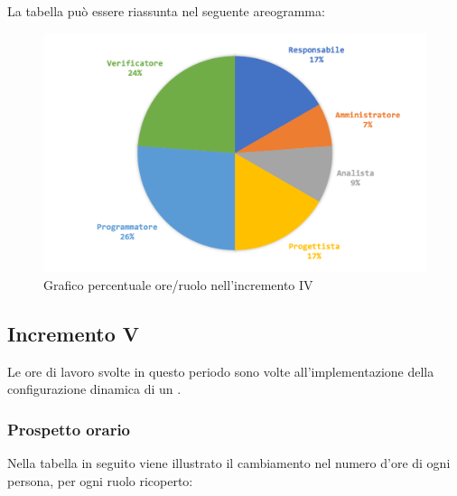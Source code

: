 			La tabella può essere riassunta nel seguente areogramma:
			\begin{figure}[H]
				\centering
				\includegraphics[width=0.8\linewidth]{images/consuntivo/ConsIncr4-2.png}
				\caption{Grafico percentuale ore/ruolo nell'incremento IV}
				\label{fig:grafico costi ruolo incremento IV}
			\end{figure}	
		


		
		\subsection{Incremento V }
		Le ore di lavoro svolte in questo periodo sono volte all'implementazione della configurazione dinamica di un .
		\subsubsection{Prospetto orario}
			Nella tabella in seguito viene illustrato il cambiamento nel numero d'ore di ogni persona, per ogni ruolo ricoperto:
			
